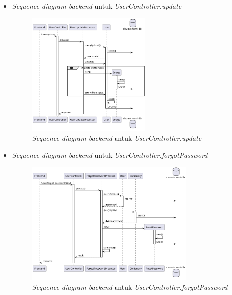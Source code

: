 \documentclass[a4paper]{article}
\begin{document}
\begin{enumerate}
\begin{enumerate}
\begin{itemize}
            \newpage
            \item \textit{Sequence diagram backend} untuk \textit{UserController.update}
            \begin{figure}[h]
                \centering
                \includegraphics*[height=6cm]{diagram/sequence diagram/BE/user controller/update/update.png}
                \caption{\textit{Sequence diagram backend} untuk \textit{UserController.update}}
            \end{figure}

            \item \textit{Sequence diagram backend} untuk \textit{UserController.forgotPassword}
            \begin{figure}[h]
                \centering
                \includegraphics*[height=6cm]{diagram/sequence diagram/BE/user controller/forgotPassword/forgotPassword.png}
                \caption{\textit{Sequence diagram backend} untuk \textit{UserController.forgotPassword}}
            \end{figure}


\end{itemize}
\end{enumerate}
\end{enumerate}
\end{document}
